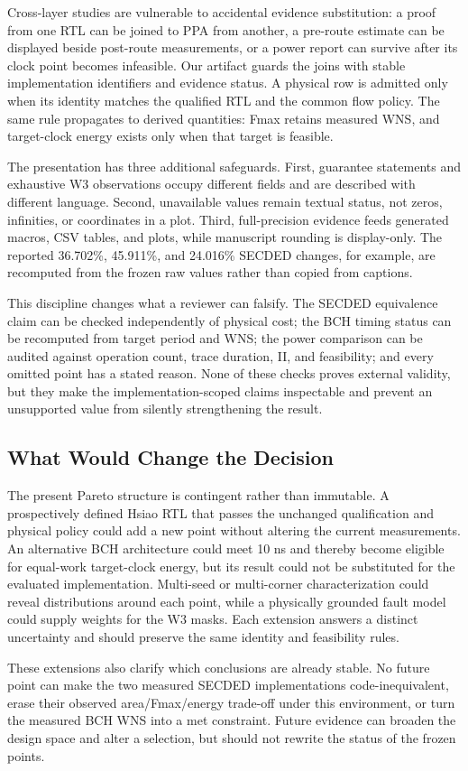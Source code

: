 Cross-layer studies are vulnerable to accidental evidence substitution: a proof from one RTL can be joined to PPA from another, a pre-route estimate can be displayed beside post-route measurements, or a power report can survive after its clock point becomes infeasible. Our artifact guards the joins with stable implementation identifiers and evidence status. A physical row is admitted only when its identity matches the qualified RTL and the common flow policy. The same rule propagates to derived quantities: Fmax retains measured WNS, and target-clock energy exists only when that target is feasible.

The presentation has three additional safeguards. First, guarantee statements and exhaustive W3 observations occupy different fields and are described with different language. Second, unavailable values remain textual status, not zeros, infinities, or coordinates in a plot. Third, full-precision evidence feeds generated macros, CSV tables, and plots, while manuscript rounding is display-only. The reported 36.702\%, 45.911\%, and 24.016\% SECDED changes, for example, are recomputed from the frozen raw values rather than copied from captions.

This discipline changes what a reviewer can falsify. The SECDED equivalence claim can be checked independently of physical cost; the BCH timing status can be recomputed from target period and WNS; the power comparison can be audited against operation count, trace duration, II, and feasibility; and every omitted point has a stated reason. None of these checks proves external validity, but they make the implementation-scoped claims inspectable and prevent an unsupported value from silently strengthening the result.

\subsection{What Would Change the Decision}

The present Pareto structure is contingent rather than immutable. A prospectively defined Hsiao RTL that passes the unchanged qualification and physical policy could add a new point without altering the current measurements. An alternative BCH architecture could meet 10 ns and thereby become eligible for equal-work target-clock energy, but its result could not be substituted for the evaluated implementation. Multi-seed or multi-corner characterization could reveal distributions around each point, while a physically grounded fault model could supply weights for the W3 masks. Each extension answers a distinct uncertainty and should preserve the same identity and feasibility rules.

These extensions also clarify which conclusions are already stable. No future point can make the two measured SECDED implementations code-inequivalent, erase their observed area/Fmax/energy trade-off under this environment, or turn the measured BCH WNS into a met constraint. Future evidence can broaden the design space and alter a selection, but should not rewrite the status of the frozen points.
